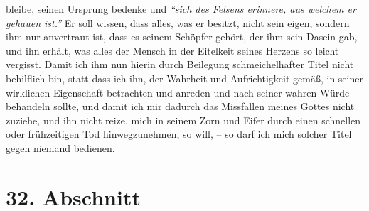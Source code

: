 bleibe,
seinen Ursprung bedenke und
\textit{"`sich des Felsens erinnere, aus welchem er gehauen
ist."'}
Er soll wissen, dass alles, was er besitzt, nicht sein
eigen, sondern ihm nur anvertraut ist, dass es seinem Schöpfer gehört, der ihm
sein Dasein gab, und ihn erhält, was alles der Mensch in der Eitelkeit
seines Herzens so leicht vergisst. Damit ich ihm nun hierin durch Beilegung
schmeichelhafter Titel nicht behilflich bin, statt dass ich ihn, der Wahrheit
und
Aufrichtigkeit gemäß, in seiner wirklichen Eigenschaft betrachten und anreden
und nach seiner wahren Würde behandeln sollte, und damit ich mir dadurch das
Missfallen meines Gottes nicht zuziehe, und ihn nicht reize, mich in seinem Zorn
und Eifer durch einen schnellen oder frühzeitigen Tod hinwegzunehmen, so will,
-- so darf ich mich solcher Titel gegen niemand bedienen.

\section{32. Abschnitt} \label{kap9_ab32}

